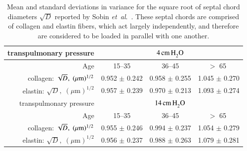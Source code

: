 \begin{table}
    \centering
    \begin{tabular}{|r|ccc|} 
        \hline 
        transpulmonary pressure &
        \multicolumn{3}{|c|}{$4 \, \mathrm{cm} \, \mathrm{H}_2^{\vphantom{|}} \mathrm{O}$} \\ 
        \hline
        Age & 15--35 & 36--45 & $>$ 65 $\vphantom{|}^{\vphantom{|}}$ \\ \hline 
        collagen: $\sqrt{D}^{\vphantom{|}}, \; ( \mu \textrm{m} )^{1/2}$ & 
        0.952 $\pm$ 0.242 & 0.958 $\pm$ 0.255 & 1.045 $\pm$ 0.270 \\
        elastin: $\sqrt{D}, \; ( \mu \textrm{m} )^{1/2}$ & 
        0.957 $\pm$ 0.239 & 0.970 $\pm$ 0.213 & 1.093 $\pm$ 0.274 \\
        \hline\hline       
        transpulmonary pressure &
        \multicolumn{3}{|c|}{$14 \, \mathrm{cm} \, \mathrm{H}_2^{\vphantom{|}} \mathrm{O}$} \\ 
        \hline
        Age & 15--35 & 36--45 & $>$ 65 $\vphantom{|}^{\vphantom{|}}$ \\ \hline 
        collagen: $\sqrt{D}^{\vphantom{|}}, \; ( \mu \textrm{m} )^{1/2}$ & 
        0.955 $\pm$ 0.246 & 0.994 $\pm$ 0.237 & 1.054 $\pm$ 0.279 \\
        elastin: $\sqrt{D}, \; ( \mu \textrm{m} )^{1/2}$ & 
        0.956 $\pm$ 0.237 & 0.988 $\pm$ 0.263 & 1.079 $\pm$ 0.281 \\
        \hline
    \end{tabular}
    \caption{\label{tab:alveolarProp}
        Mean and standard deviations in variance for the square root of septal chord diameters $\sqrt{D}$ reported by Sobin \textit{et~al}.\ \cite{Sobinetal88}.  These septal chords are comprised of collagen and elastin fibers, which act largely independently, and therefore are considered to be loaded in parallel with one another.}
\end{table}

